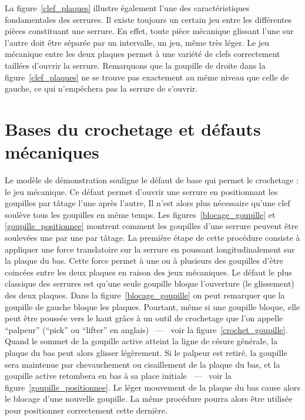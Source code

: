 \documentclass[a4paper,french,11pt,twoside]{report}
\begin{document}
La figure~\ref{clef_plaques} illustre également l'une des caractéristiques fondamentales des serrures. Il existe toujours un certain jeu entre les différentes pièces constituant une serrure. En effet, toute pièce mécanique glissant l'une sur l'autre doit être séparée par un intervalle, un jeu, même très léger. Le jeu mécanique entre les deux plaques permet à une variété de clefs correctement taillées d'ouvrir la serrure. Remarquons que la goupille de droite dans la figure~\ref{clef_plaques} ne se trouve pas exactement au même niveau que celle de gauche, ce qui n'empêchera pas la serrure de s'ouvrir.

\chapter{\label{chap:bases_defauts_mecaniques}Bases du crochetage et défauts mécaniques}

Le modèle de démonstration souligne le défaut de base qui permet le crochetage : le jeu mécanique. Ce défaut permet d'ouvrir une serrure en positionnant les goupilles par tâtage l'une après l'autre, Il n'est alors plus nécessaire qu'une clef soulève tous les goupilles en même temps. Les figures~\ref{blocage_goupille} et \ref{goupille_positionnee} montrent comment les goupilles d'une serrure peuvent être soulevées une par une par tâtage. La première étape de cette procédure consiste à appliquer une force translatoire sur la serrure en poussant longitudinalement sur la plaque du bas. Cette force permet à une ou à plusieurs des goupilles d'être coincées entre les deux plaques en raison des jeux mécaniques. Le défaut le plus classique des serrures est qu'une seule goupille bloque l'ouverture (le glissement) des deux plaques. Dans la figure~\ref{blocage_goupille} on peut remarquer que la goupille de gauche bloque les plaques. Pourtant, même si une goupille bloque, elle peut être poussée vers le haut grâce à un outil de crochetage que l'on appelle \enquote{palpeur} (\enquote{pick} ou \enquote{lifter} en anglais) ~---~ voir la figure~\ref{crochet_goupille}. Quand le sommet de la goupille active atteint la ligne de césure générale, la plaque du bas peut alors glisser légèrement. Si le palpeur est retiré, la goupille sera maintenue par chevauchement ou cisaillement de la plaque du bas, et la goupille active retombera en bas à sa place initiale ~---~ voir la figure~\ref{goupille_positionnee}. Le léger mouvement de la plaque du bas cause alors le blocage d'une nouvelle goupille. La même procédure pourra alors être utilisée pour positionner correctement cette dernière.
\end{document}
